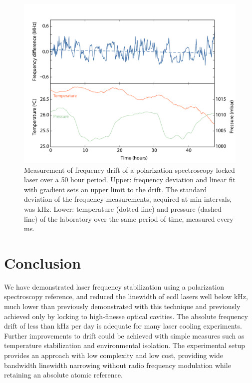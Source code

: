\begin{figure}[htbp]
\centering
\includegraphics[width=\linewidth]{part1/Figs/fig6_v1.pdf}
\caption{Measurement of frequency drift of a polarization spectroscopy locked laser over a 50 hour period.
Upper: frequency deviation and linear fit with gradient  sets an upper limit to the drift.
The standard deviation of the frequency measurements, acquired at \unit[5]{min} intervals, was \unit[155]{kHz}.
Lower: temperature (dotted line) and pressure (dashed line) of the laboratory over the same period of time, measured every \unit[200]{ms}.}
\label{drift}
\end{figure}

\section{Conclusion}
We have demonstrated laser frequency stabilization using a polarization spectroscopy reference, and reduced the linewidth of \gls*{ecdl} lasers well below \unit[1]{kHz}, much lower than previously demonstrated with this technique and previously achieved only by locking to high-finesse optical cavities.
The absolute frequency drift of less than \unit[50]{kHz} per day is adequate for many laser cooling experiments.
Further improvements to drift could be achieved with simple measures such as temperature stabilization and environmental isolation.
The experimental setup provides an approach with low complexity and low cost, providing wide bandwidth linewidth narrowing without radio frequency modulation while retaining an absolute atomic reference.

